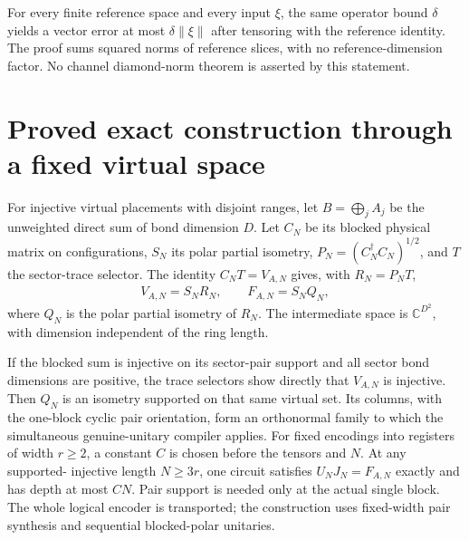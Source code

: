 \documentclass{article}
\begin{document}
For every finite reference space and every input $\xi$, the same operator
bound $\delta$ yields a vector error at most $\delta\|\xi\|$ after tensoring
with the reference identity. The proof sums squared norms of reference
slices, with no reference-dimension factor. No channel diamond-norm theorem
is asserted by this statement.

\section{Proved exact construction through a fixed virtual space}
For injective virtual placements with disjoint ranges, let $B=\bigoplus_jA_j$
be the unweighted direct sum of bond dimension $D$. Let $C_N$ be its
blocked physical matrix on configurations, $S_N$ its polar partial
isometry, $P_N=(C_N^\dagger C_N)^{1/2}$, and $T$ the sector-trace selector.
The identity $C_NT=V_{A,N}$ gives, with $R_N=P_NT$,
\begin{align}
    V_{A,N}=S_NR_N,\qquad F_{A,N}=S_NQ_N,
\end{align}
where $Q_N$ is the polar partial isometry of $R_N$. The intermediate
space is $\mathbb C^{D^2}$, with dimension independent of the ring length.

If the blocked sum is injective on its sector-pair support and all sector
bond dimensions are positive, the trace selectors show directly that
$V_{A,N}$ is injective. Then $Q_N$ is an isometry supported on that same
virtual set. Its columns, with the one-block cyclic pair orientation,
form an orthonormal family to which the simultaneous genuine-unitary
compiler applies. For fixed encodings into registers of width $r\ge2$,
a constant $C$ is chosen before the tensors and $N$. At any supported-
injective length $N\ge3r$, one circuit satisfies $U_NJ_N=F_{A,N}$ exactly
and has depth at most $CN$. Pair support is needed only at the actual
single block. The whole logical encoder is transported; the construction
uses fixed-width pair synthesis and sequential blocked-polar unitaries.
\end{document}
